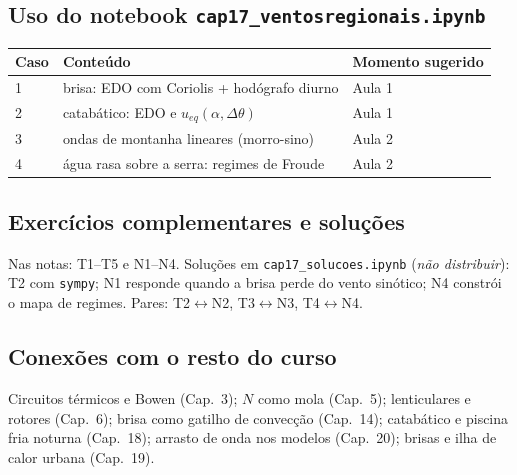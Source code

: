 \subsection*{Uso do notebook \texttt{cap17\_ventosregionais.ipynb}}

\begin{center}
\begin{tabular}{lll}
\hline
Caso & Conteúdo & Momento sugerido \\
\hline
1 & brisa: EDO com Coriolis + hodógrafo diurno & Aula 1 \\
2 & catabático: EDO e $u_{eq}(\alpha, \Delta\theta)$ & Aula 1 \\
3 & ondas de montanha lineares (morro-sino) & Aula 2 \\
4 & água rasa sobre a serra: regimes de Froude & Aula 2 \\
\hline
\end{tabular}
\end{center}

\subsection*{Exercícios complementares e soluções}

Nas notas: T1--T5 e N1--N4. Soluções em \texttt{cap17\_solucoes.ipynb}
(\emph{não distribuir}): T2 com \texttt{sympy}; N1 responde quando a
brisa perde do vento sinótico; N4 constrói o mapa de regimes. Pares:
T2$\leftrightarrow$N2, T3$\leftrightarrow$N3, T4$\leftrightarrow$N4.

\subsection*{Conexões com o resto do curso}

Circuitos térmicos e Bowen (Cap.~3); $N$ como mola (Cap.~5);
lenticulares e rotores (Cap.~6); brisa como gatilho de convecção
(Cap.~14); catabático e piscina fria noturna (Cap.~18); arrasto de
onda nos modelos (Cap.~20); brisas e ilha de calor urbana (Cap.~19).
